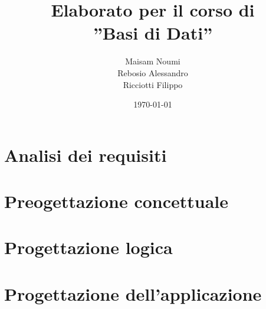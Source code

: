 \documentclass[a4paper,12pt]{report}
\title{Elaborato per il corso di\\''Basi di Dati''}
\author{
    Maisam Noumi\\
    Rebosio Alessandro\\
    Ricciotti Filippo
}
\date{\today}
\begin{document}
\maketitle

\tableofcontents

\chapter{Analisi dei requisiti}

\chapter{Preogettazione concettuale}

\chapter{Progettazione logica}

\chapter{Progettazione dell'applicazione}
\end{document}
